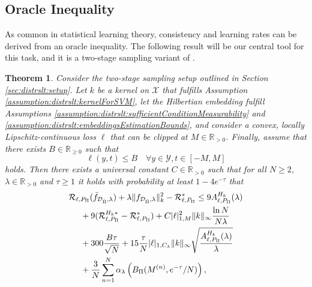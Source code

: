 \documentclass[letterpaper]{article} %
\newcommand{\R}{\mathbb{R}}
\newcommand{\Rnn}{\R_{\geq 0}}
\newcommand{\Rp}{\R_{> 0}}
\newcommand{\inputSet}{\mathcal{X}} %
\newcommand{\outputSet}{\mathcal{Y}} %
\newcommand{\dataSet}{\mathcal{D}}
\newcommand{\risk}{\mathcal{R}} %
\newcommand{\Risk}[2]{\risk_{{#1},{#2}}} %
\newcommand{\RiskBayes}[2]{\risk_{{#1},{#2}}^\ast} %
\newcommand{\LocLip}[2]{|#1|_{1,{#2}}} %
\newcommand{\hilbertianEmbed}{\Pi} %
\newcommand{\ApproxErrorFunc}[3]{A^{#3}_{#1,#2}}
\newcommand{\Aef}{\ApproxErrorFunc{\ell}{P_\hilbertianEmbed}{H_k}}
\newcommand{\hilbertianEmbedBound}{B_\hilbertianEmbed} %
\newcommand{\clipped}[1]{\bar{#1}}
\newcommand{\clipValue}{M}
\newtheorem{theorem}{Theorem}
\newif\ifTwoColumns
\begin{document}
\subsection{Oracle Inequality} \label{sec:distrslt:oracleInequality}
As common in statistical learning theory, consistency and learning rates can be derived from an oracle inequality.
The following result will be our central tool for this task, and it is a two-stage sampling variant of \cite[Theorem~7.22]{SC08}.
\begin{theorem} \label{thm:distrslt:oracleInequSVM}
Consider the two-stage sampling setup outlined in Section \ref{sec:distrslt:setup}.
Let $k$ be a kernel on $\inputSet$ that fulfills Assumption \ref{assumption:distrslt:kernelForSVM},
let the Hilbertian embedding fulfill Assumptions \ref{assumption:distrslt:sufficientConditionMeasurability} and \ref{assumption:distrslt:embeddingsEstimationBounds},
and consider a convex, locally Lipschitz-continuous loss $\ell$ that can be clipped at $\clipValue\in\Rp$.
Finally, assume that there exists $B\in\Rnn$ such that
\begin{equation}
    \ell(y,t) \leq B \quad \forall y\in \outputSet, t\in[-\clipValue,\clipValue]
\end{equation}
holds.
Then there exists a universal constant $C\in\Rp$ such that for all $N\geq 2$, $\lambda\in\Rp$ and $\tau\geq 1$ it holds with probability at least $1-4e^{-\tau}$ that
\ifTwoColumns
\begin{align} \label{eq:distrslt:oracleInequSVM}
    & \Risk{\ell}{P_\hilbertianEmbed}(\clipped{f}_{\dataSet_{\hat\hilbertianEmbed},\lambda})
        + \lambda \|f_{\dataSet_{\hat\hilbertianEmbed},\lambda}\|_k^2 - \RiskBayes{\ell}{P_\hilbertianEmbed}
        \leq 9 \Aef(\lambda)  \\ \nonumber
    & \hspace{0.5cm} + 9(\Risk{\ell}{P_{\hilbertianEmbed}}^{H_k\ast} - \RiskBayes{\ell}{P_\hilbertianEmbed}) 
        + C \LocLip{\ell}{M}^2\|k\|_\infty \frac{\ln N}{N\lambda} \\ \nonumber 
    & \hspace{0.5cm} + 300 \frac{B\tau}{\sqrt{N}} 
        + 15\frac{\tau}{N}\LocLip{\ell}{C_\lambda}\|k\|_\infty\sqrt{\frac{\Aef(\lambda)}{\lambda}} \\ \nonumber
    & \hspace{0.5cm} + \frac{3}{N}\sum_{n=1}^N \alpha_\lambda\left(\hilbertianEmbedBound(M^{(n)},e^{-\tau}/N)\right),
\end{align}
\else
\begin{align}  \label{eq:distrslt:oracleInequSVM}

\end{align}
\end{theorem}
\end{document}
